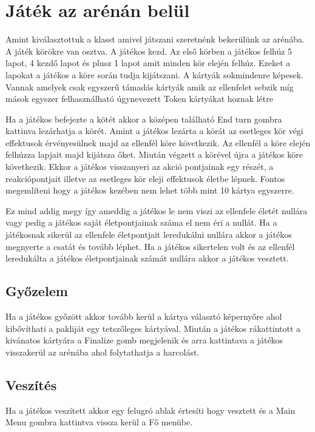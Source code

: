 \section{Játék az arénán belül}

Amint kiválasztottuk a klasst amivel játszani szeretnénk bekerülünk az arénába. A játék körökre van osztva. A játékos kezd. Az első körben a játékos felhúz 5 lapot, 4 kezdő lapot és plusz 1 lapot amit minden kör elején felhúz. Ezeket a lapokat a játékos a köre során tudja kijátszani. A kártyák sokmindenre képesek. Vannak amelyek csak egyszerű támadás kártyák amik az ellenfelet sebzik míg mások egyszer felhasználható úgynevezett Token kártyákat hoznak létre 

Ha a játékos befejezte a kötét akkor a középen található End turn gombra kattinva lezárhatja a körét. Amint a játékos lezárta a körát az esetleges kör végi effektusok érvényesülnek majd az ellenfél köre következik. Az ellenfél a köre elején felhúzza lapjait majd kijátsza őket. Miután végzett a körével újra a játékos köre következik. Ekkor a játékos visszanyeri az akció pontjainak egy részét, a reakciópontjait illetve az esetleges kör eleji effektusok életbe lépnek. Fontos megemlíteni hogy a játékos kezében nem lehet több mint 10 kártya egyszerre.

Ez mind addig megy így ameddig a játékos le nem viszi az ellenfele életét nullára vagy pedig a játékos saját életpontjainak száma el nem éri a nullát. Ha a játékosnak sikerül az ellenfele életpontjait leredukálni nullára akkor a játékos megnyerte a csatát és tovább léphet. Ha a játékos sikertelen volt és az ellenfél leredukálta a játékos életpontjainak számát nullára akkor a játékos vesztett.

\subsection{Győzelem}
Ha a játékos győzött akkor tovább kerül a kártya választó képernyőre ahol kibővíthati a pakliját egy tetszőleges kártyával. Miután a játékos rákattintott a kivánatos kártyára a Finalize gomb megjelenik és arra kattintava a játékos visszakerül az arénába ahol folytathatja a harcolást.

\subsection{Veszítés}
Ha a játékos veszített akkor egy felugró ablak értesíti hogy vesztett és a Main Menu gombra kattintva vissza kerül a Fő menübe.

